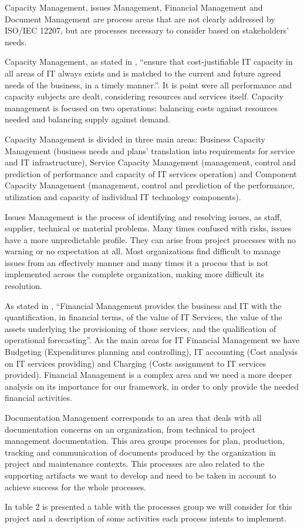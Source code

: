 Capacity Management, issues Management, Financial Management and Document Management are process areas that are not clearly addressed by ISO/IEC 12207, but are processes necessary to consider based on stakeholders' needs.\par
Capacity Management, as stated in \cite{itilSD}, ``ensure that cost-justifiable IT capacity in all areas of IT always exists and is matched to the current and future agreed needs of the business, in a timely manner.''. It is point were all performance and capacity subjects are dealt, considering resources and services itself. Capacity management is focused on two operations: balancing costs against resources needed and balancing supply against demand.\par
Capacity Management is divided in three main areas: Business Capacity Management (business needs and plans' translation into requirements for service and IT infrastructure), Service Capacity Management (management, control and prediction of performance and capacity of IT services operation) and Component Capacity Management (management, control and prediction of the performance, utilization and capacity of individual IT technology components).\par
Issues Management is the process of identifying and resolving issues, as staff, supplier, technical or material problems. Many times confused with risks, issues have a more unpredictable profile. They can arise from project processes with no warning or no expectation at all. Most organizations find difficult to manage issues from an effectively manner and many times it a process that is not implemented across the complete organization, making more difficult its resolution.\par
As stated in \cite{itilSS}, ``Financial Management provides the business and IT with the quantification, in financial terms, of the value of IT Services, the value of the assets underlying the provisioning of those services, and the qualification of operational forecasting''. As the main areas for IT Financial Management we have Budgeting (Expenditures planning and controlling), IT accounting (Cost analysis on IT services providing) and Charging (Costs assignment to IT services provided). Financial Management is a complex area and we need a more deeper analysis on its importance for our framework, in order to only provide the needed financial activities.\par
Documentation Management corresponds to an area that deals with all documentation concerns on an organization, from technical to project management documentation. This area groups processes for plan, production, tracking and communication of documents produced by the organization in project and maintenance contexts. This processes are also related to the supporting artifacts we want to develop and need to be taken in account to achieve success for the whole processes.\par
In table 2 is presented a table with the processes group we will consider for this project and a description of some activities each process intents to implement.

